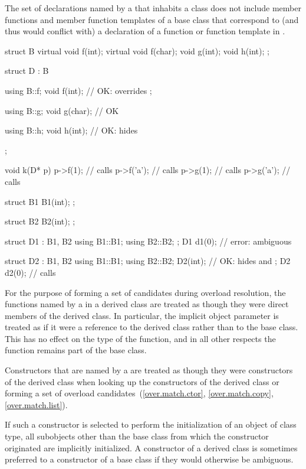 \pnum
{}%
The set of declarations named by a 
that inhabits a class  does not include
member functions and member function templates of a base class
that correspond to (and thus would conflict with)
a declaration of a function or function template in .
\begin{example}
\begin{codeblock}
struct B {
  virtual void f(int);
  virtual void f(char);
  void g(int);
  void h(int);
};

struct D : B {
  using B::f;
  void f(int);      // OK:  overrides ;

  using B::g;
  void g(char);     // OK

  using B::h;
  void h(int);      // OK:  hides 
};

void k(D* p)
{
  p->f(1);          // calls 
  p->f('a');        // calls 
  p->g(1);          // calls 
  p->g('a');        // calls 
}

struct B1 {
  B1(int);
};

struct B2 {
  B2(int);
};

struct D1 : B1, B2 {
  using B1::B1;
  using B2::B2;
};
D1 d1(0);           // error: ambiguous

struct D2 : B1, B2 {
  using B1::B1;
  using B2::B2;
  D2(int);          // OK:  hides  and 
};
D2 d2(0);           // calls 
\end{codeblock}
\end{example}

\pnum
{}%
\begin{note}
For the purpose of forming a set of candidates during overload resolution,
the functions
named by a  in a derived class
are treated as though they were direct members of the derived class. In
particular, the implicit object parameter is treated as if
it were a reference to the derived class rather than to the base class.
This has no effect on the type of the function, and in all other
respects the function remains part of the base class.
\end{note}

\pnum
Constructors that are named by a 
are treated as though they were constructors of the derived class
when looking up the constructors of the derived class
or forming a set of overload candidates~(\ref{over.match.ctor}, \ref{over.match.copy}, \ref{over.match.list}).
\begin{note}
If such a constructor is selected to perform the initialization
of an object of class type, all subobjects other than the base class
from which the constructor originated
are implicitly initialized.
A constructor of a derived class is sometimes preferred to a constructor of a base class
if they would otherwise be ambiguous.
\end{note}

